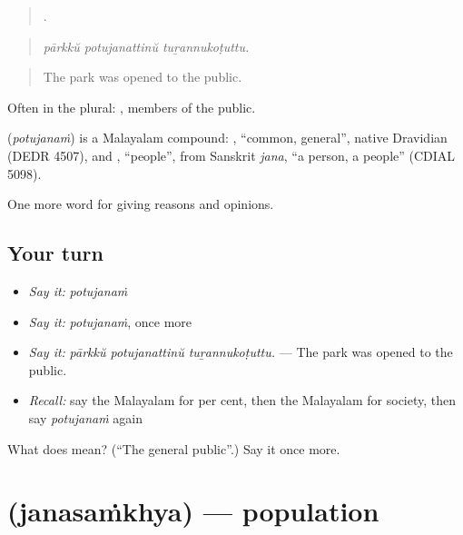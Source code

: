 \begin{quote}
  .
\end{quote}

\begin{quote}
\emph{pārkkŭ potujanattinŭ tuṟannukoṭuttu.}
\end{quote}

\begin{quote}
The park was opened to the public.
\end{quote}

Often in the plural: , members of the public.

\begin{cousinweb}
\textbf{} (\emph{potujanaṁ}) is a Malayalam compound: , \textquotedblleft{}common, general\textquotedblright{}, native Dravidian (DEDR 4507), and , \textquotedblleft{}people\textquotedblright{}, from Sanskrit \emph{jana}, \textquotedblleft{}a person, a people\textquotedblright{} (CDIAL 5098).
\end{cousinweb}

\begin{grammarlens}[title={What you've built}]
One more word for giving reasons and opinions.
\end{grammarlens}

\subsection*{Your turn}
\begin{itemize}
\raggedright
  \item \emph{Say it:} \emph{potujanaṁ}
  \item \emph{Say it:} \emph{potujanaṁ}, once more
  \item \emph{Say it:} \emph{pārkkŭ potujanattinŭ tuṟannukoṭuttu.} — The park was opened to the public.
  \item \emph{Recall:} say the Malayalam for per cent, then the Malayalam for society, then say \emph{potujanaṁ} again
\end{itemize}

\begin{tcolorbox}[breakable,colback=teal!4,colframe=teal!35!black,title={Before you move on}]
What does  mean? (\textquotedblleft{}The general public\textquotedblright{}.) Say it once more.
\end{tcolorbox}
\section[\texorpdfstring{\ml{ജനസംഖ്യ} (janasaṁkhya)}{ജനസംഖ്യ (janasaṁkhya)}]{ (janasaṁkhya) — population}

